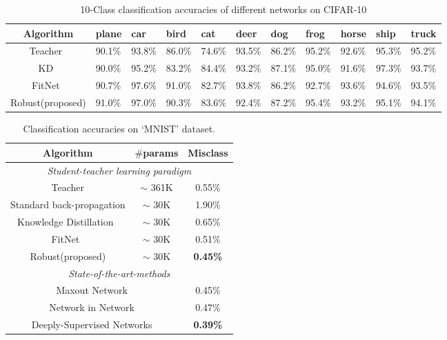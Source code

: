 \documentclass[journal]{IEEEtran}
\begin{document}
\begin{table*}[htb]
\setlength{\abovecaptionskip}{0.2cm}
\setlength{\belowcaptionskip}{0.2cm}
\renewcommand\arraystretch{1}
\centering
\small
\caption{10-Class classification accuracies of different networks on CIFAR-10}
\begin{tabular}{|c|*{10}{p{}<{\centering}|}}
\hline
\textbf{Algorithm} &  \textbf{plane}  &  \textbf{car}  &  \textbf{bird}  &  \textbf{cat}  &  \textbf{deer}  &  \textbf{dog}  &  \textbf{frog}  &  \textbf{horse}  &  \textbf{ship}  &  \textbf{truck}   \\
\hline
\hline
Teacher~\cite{goodfellow2013maxout}  & 90.1\%  &  93.8\%  &  86.0\%  &  74.6\%  &  93.5\%  &  86.2\%  &  95.2\%  &  92.6\%  &  95.3\%  &  95.2\%   \\
\hline
KD~\cite{hinton2015distilling}  & 90.0\%  &  95.2\%  &  83.2\%  &  84.4\%  &  93.2\%  &  87.1\%  &  95.0\%  &  91.6\%  &  97.3\%  &  93.7\%  \\
\hline
FitNet~\cite{romero2014fitnets}  & 90.7\%  &  97.6\%  &  91.0\%  &  82.7\%  &  93.8\%  &  86.2\%  &  92.7\%  &  93.6\%  &  94.6\%  &  93.5\%   \\
\hline
\hline
Robust(proposed)  & 91.0\%  &  97.0\%  &  90.3\%  &  83.6\%  &  92.4\%  &  87.2\%  &  95.4\%  &  93.2\%  &  95.1\%  &  94.1\%   \\
\hline
\end{tabular}
\label{tab_cifar_class}
\end{table*}

\begin{table}[hb]
\renewcommand\arraystretch{1}
\centering
\small
\setlength{\abovecaptionskip}{0.2cm}
\setlength{\belowcaptionskip}{0.2cm}
\caption{Classification accuracies on `MNIST' dataset.}
\begin{tabular}{|c|c|c|}
\hline
\textbf{Algorithm}  &  \textbf{$\#$\textbf{params}}  &  \textbf{\textbf{Misclass}} \\
\hline
\hline
\multicolumn{3}{|c|}{\emph{Student-teacher learning paradigm}} \\
\hline
\hline
Teacher  &  $\sim$ 361K  &  0.55\%  \\
\hline
Standard back-propagation  &  $\sim$ 30K  &  1.90\%  \\
\hline
Knowledge Distillation~\cite{hinton2015distilling}   &  $\sim$ 30K  &  0.65\%  \\
\hline
FitNet~\cite{romero2014fitnets}  &  $\sim$ 30K  &  0.51\%  \\
\hline
Robust(proposed)  &  $\sim$ 30K  &  \textbf{0.45\%}  \\
\hline
\hline
\multicolumn{3}{|c|}{\emph{State-of-the-art-methods}} \\
\hline
\hline
\multicolumn{2}{|c|}{Maxout Network~\cite{goodfellow2013maxout}}  &  0.45\% \\
\hline
\multicolumn{2}{|c|}{Network in Network~\cite{lin2013network}}  &  0.47\% \\
\hline
\multicolumn{2}{|c|}{Deeply-Supervised Networks~\cite{lee2015deeply}}  &  \textbf{0.39\%} \\
\hline
\end{tabular}
\label{tab_mnist}
\end{table}
\end{document}
